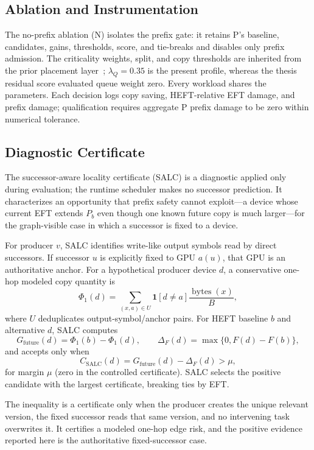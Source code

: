 \documentclass[sigconf]{acmart}
\begin{document}
\subsection{Ablation and Instrumentation}\label{sec:ablation}

The no-prefix ablation (N) isolates the prefix gate: it retains P's baseline, candidates, gains, thresholds, score, and tie-breaks and disables only prefix admission. The criticality weights, split, and copy thresholds are inherited from the prior placement layer~\citep{chengli2026multiobjective}; \(\lambda_Q=0.35\) is the present profile, whereas the thesis residual score evaluated queue weight zero. Every workload shares the parameters. Each decision logs copy saving, HEFT-relative EFT damage, and prefix damage; qualification requires aggregate P prefix damage to be zero within numerical tolerance.

\subsection{Diagnostic Certificate}\label{sec:diagnostic-certificate}

The successor-aware locality certificate (SALC) is a diagnostic applied only during evaluation; the runtime scheduler makes no successor prediction. It characterizes an opportunity that prefix safety cannot exploit---a device whose current EFT extends \(P_b\) even though one known future copy is much larger---for the graph-visible case in which a successor is fixed to a device.

For producer \(v\), SALC identifies write-like output symbols read by direct successors. If successor \(u\) is explicitly fixed to GPU \(a(u)\), that GPU is an authoritative anchor. For a hypothetical producer device \(d\), a conservative one-hop modeled copy quantity is
\[
\Phi_1(d)=
\sum_{(x,a)\in U}
\mathbf{1}[d\ne a]\frac{\operatorname{bytes}(x)}{B},
\]
where \(U\) deduplicates output-symbol/anchor pairs. For HEFT baseline \(b\) and alternative \(d\), SALC computes
\[
G_{\mathrm{future}}(d)=\Phi_1(b)-\Phi_1(d),
\qquad
\Delta_F(d)=\max\{0,F(d)-F(b)\},
\]
and accepts only when
\[
C_{\mathrm{SALC}}(d)=G_{\mathrm{future}}(d)-\Delta_F(d)>\mu,
\]
for margin \(\mu\) (zero in the controlled certificate). SALC selects the positive candidate with the largest certificate, breaking ties by EFT.

The inequality is a certificate only when the producer creates the unique relevant version, the fixed successor reads that same version, and no intervening task overwrites it. It certifies a modeled one-hop edge risk, and the positive evidence reported here is the authoritative fixed-successor case.
\end{document}
